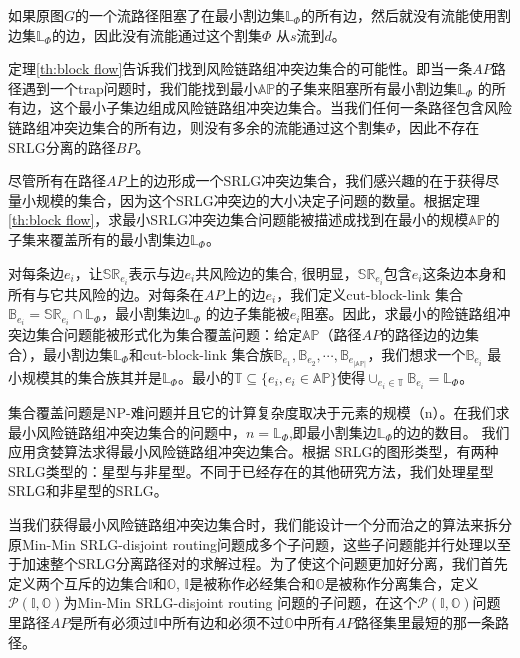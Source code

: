 \begin{pro}
 如果原图$G$的一个流路径阻塞了在最小割边集$\mathbb{L}_{\Phi}$的所有边，然后就没有流能使用割边集$\mathbb{L}_{\Phi}$的边，因此没有流能通过这个割集${\Phi}$ 从$s$流到$d$。
\end{pro}

定理\ref{th:block flow}告诉我们找到风险链路组冲突边集合的可能性。即当一条$AP$路径遇到一个trap问题时，我们能找到最小$\mathbb{AP}$的子集来阻塞所有最小割边集$\mathbb{L}_{\Phi}$ 的所有边，这个最小子集边组成风险链路组冲突边集合。当我们任何一条路径包含风险链路组冲突边集合的所有边，则没有多余的流能通过这个割集$\Phi$，因此不存在SRLG分离的路径$BP$。

尽管所有在路径$AP$上的边形成一个SRLG冲突边集合，我们感兴趣的在于获得尽量小规模的集合，因为这个SRLG冲突边的大小决定子问题的数量。根据定理\ref{th:block flow}，求最小SRLG冲突边集合问题能被描述成找到在最小的规模$\mathbb{AP}$的子集来覆盖所有的最小割集边$\mathbb{L}_{\Phi}$。

对每条边$e_i$，让$\mathbb{SR}_{e_i}$表示与边$e_i$共风险边的集合, 很明显，$\mathbb{SR}_{e_i}$包含$e_i$这条边本身和所有与它共风险的边。对每条在$AP$上的边$e_i$，我们定义cut-block-link 集合${\mathbb{B}_{{e_i}}} = \mathbb{SR}_{{e_i}} \cap \mathbb{L}_{\Phi}$，最小割集边$\mathbb{L}_{\Phi}$ 的边子集能被$e_i$阻塞。因此，求最小的险链路组冲突边集合问题能被形式化为集合覆盖问题：给定$\mathbb{AP}$（路径$AP$的路径边的边集合），最小割边集$\mathbb{L}_{\Phi}$和cut-block-link 集合族${\mathbb{B}_{{e_1}}},{\mathbb{B}_{{e_2}}}, \cdots ,{\mathbb{B}_{{e_{|\mathbb{AP}|}}}}$，我们想求一个$\mathbb{B}_{{e_i}}$ 最小规模其的集合族其并是$\mathbb{L}_{\Phi}$。最小的$\mathbb{T} \subseteq \{e_i, e_i\in \mathbb{AP}\}$使得${ \cup_{e_i \in \mathbb{T}}}{\mathbb{B}_{e_i}} = \mathbb{L}_{\Phi}$。

集合覆盖问题是NP-难问题并且它的计算复杂度取决于元素的规模（n）。在我们求最小风险链路组冲突边集合的问题中，$n=\mathbb{L}_{\Phi}$,即最小割集边$\mathbb{L}_{\Phi}$的边的数目。 我们应用贪婪算法求得最小风险链路组冲突边集合。根据
SRLG的图形类型，有两种SRLG类型的：星型与非星型。不同于已经存在的其他研究方法，我们处理星型SRLG和非星型的SRLG。

当我们获得最小风险链路组冲突边集合时，我们能设计一个分而治之的算法来拆分原Min-Min SRLG-disjoint routing问题成多个子问题，这些子问题能并行处理以至于加速整个SRLG分离路径对的求解过程。为了使这个问题更加好分离，我们首先定义两个互斥的边集合$\mathbb{I}$和$\mathbb{O}$, $\mathbb{I}$是被称作必经集合和$\mathbb{O}$是被称作分离集合，定义$\mathcal{P}({\mathbb{I},\mathbb{O}})$为Min-Min SRLG-disjoint routing 问题的子问题，在这个$\mathcal{P}({\mathbb{I},\mathbb{O}})$问题里路径$AP$是所有必须过$\mathbb{I}$中所有边和必须不过$\mathbb{O}$中所有$AP$路径集里最短的那一条路径。

